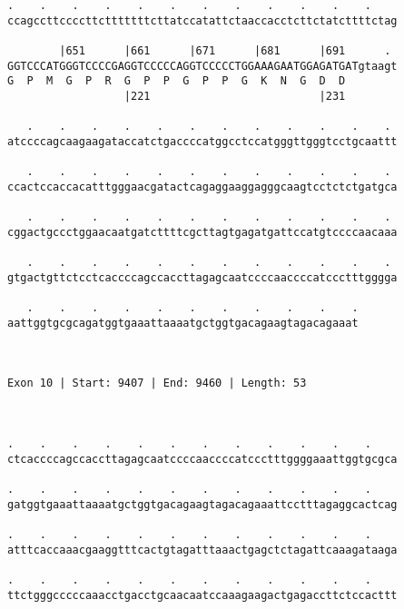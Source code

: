 \documentclass{article}
\begin{document}
\begin{Verbatim}
.    .    .    .    .    .    .    .    .    .    .    .    
ccagccttccccttctttttttcttatccatattctaaccacctcttctatcttttctag
                                                            
        |651      |661      |671      |681      |691      . 
GGTCCCATGGGTCCCCGAGGTCCCCCAGGTCCCCCTGGAAAGAATGGAGATGATgtaagt
G  P  M  G  P  R  G  P  P  G  P  P  G  K  N  G  D  D        
                  |221                          |231        
  
   .    .    .    .    .    .    .    .    .    .    .    . 
atccccagcaagaagataccatctgaccccatggcctccatgggttgggtcctgcaattt
                                                            
   .    .    .    .    .    .    .    .    .    .    .    . 
ccactccaccacatttgggaacgatactcagaggaaggagggcaagtcctctctgatgca
                                                            
   .    .    .    .    .    .    .    .    .    .    .    . 
cggactgccctggaacaatgatcttttcgcttagtgagatgattccatgtccccaacaaa
                                                            
   .    .    .    .    .    .    .    .    .    .    .    . 
gtgactgttctcctcaccccagccaccttagagcaatccccaaccccatccctttgggga
                                                            
   .    .    .    .    .    .    .    .    .    .    .
aattggtgcgcagatggtgaaattaaaatgctggtgacagaagtagacagaaat
                                                      
                                                      
 
Exon 10 | Start: 9407 | End: 9460 | Length: 53



.    .    .    .    .    .    .    .    .    .    .    .    
ctcaccccagccaccttagagcaatccccaaccccatccctttggggaaattggtgcgca
                                                            
.    .    .    .    .    .    .    .    .    .    .    .    
gatggtgaaattaaaatgctggtgacagaagtagacagaaattcctttagaggcactcag
                                                            
.    .    .    .    .    .    .    .    .    .    .    .    
atttcaccaaacgaaggtttcactgtagatttaaactgagctctagattcaaagataaga
                                                            
.    .    .    .    .    .    .    .    .    .    .    .    
ttctgggcccccaaacctgacctgcaacaatccaaagaagactgagaccttctccacttt
                                                            

\end{Verbatim}
\end{document}
